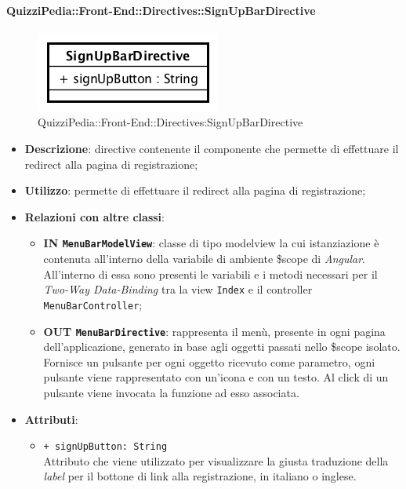\paragraph{QuizziPedia::Front-End::Directives::SignUpBarDirective}

\label{QuizziPedia::Front-End::Directives::SignUpBarDirective}
\begin{figure} [ht]
	\centering
	\includegraphics[scale=0.80]{UML/Classi/Front-End/QuizziPedia_Front-end_Directives_SignUpBarDirective.png}
	\caption{QuizziPedia::Front-End::Directives:SignUpBarDirective}
\end{figure} \FloatBarrier
\begin{itemize}
	\item \textbf{Descrizione}: directive contenente il componente che permette di effettuare il redirect alla pagina di registrazione;
	\item \textbf{Utilizzo}: permette di effettuare il redirect alla pagina di registrazione;
	\item \textbf{Relazioni con altre classi}:
	\begin{itemize}
		\item \textbf{IN \texttt{MenuBarModelView}}: classe di tipo modelview la cui istanziazione è contenuta all'interno della variabile di ambiente \$scope di \textit{Angular}. All'interno di essa sono presenti le variabili e i metodi necessari per il \textit{Two-Way Data-Binding} tra la view \texttt{Index} e il controller \texttt{MenuBarController};
		\item \textbf{OUT \texttt{MenuBarDirective}}: rappresenta il menù, presente in ogni pagina dell'applicazione, generato in base agli oggetti passati nello \$scope isolato. Fornisce un pulsante per ogni oggetto ricevuto come parametro, ogni pulsante viene rappresentato con un’icona e con un testo. Al click di un pulsante viene invocata la funzione ad esso associata.  
	\end{itemize}
	\item \textbf{Attributi}:
	\begin{itemize}
		\item \texttt{+ signUpButton: String} \\ Attributo che viene utilizzato per visualizzare la giusta traduzione della \textit{label} per il bottone di link alla registrazione, in italiano o inglese.
	\end{itemize}
\end{itemize}